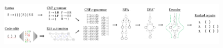 \documentclass[sigplan,acmsmall,nonacm,screen]{acmart}\settopmatter{printfolios=false,printccs=false,printacmref=false}
\begin{document}
  \begin{figure}[h!]
    \includegraphics[width=\textwidth]{flow.pdf}\vspace{-1pt}


\end{figure}
\end{document}
